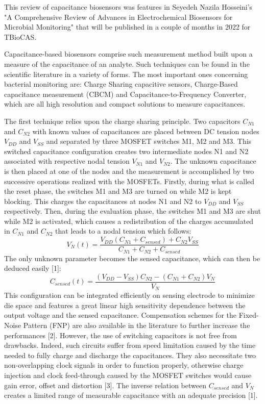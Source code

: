 This review of capacitance biosensors was features in Seyedeh Nazila Hosseini's "A Comprehensive Review of Advances in Electrochemical Biosensors for Microbial Monitoring" that will be published in a couple of months in 2022 for TBioCAS. \par

Capacitance-based biosensors comprise such measurement method built upon a measure of the capacitance of an analyte. Such techniques can be found in the scientific literature in a variety of forms. The most important ones concerning bacterial monitoring are: Charge Sharing capacitive sensors, Charge-Based capacitance measurement (CBCM) and Capacitance-to-Frequency Converter, which are all high resolution and compact solutions to measure capacitances. \par

The first technique relies upon the charge sharing principle. Two capacitors $C_{N1}$ and $C_{N2}$ with known values of capacitances are placed between DC tension nodes $V_{DD}$ and $V_{SS}$ and separated by three MOSFET switches M1, M2 and M3. This switched capacitance configuration creates two intermediate nodes N1 and N2 associated with respective nodal tension $V_{N1}$ and $V_{N2}$. The unknown capacitance is then placed at one of the nodes and the measurement is accomplished by two successive operations realized with the MOSFETs. Firstly, during what is called the reset phase, the switches M1 and M3 are turned on while M2 is kept blocking. This charges the capacitances at nodes N1 and N2 to $V_{DD}$ and $V_{SS}$ respectively. Then, during the evaluation phase, the switches M1 and M3 are shut while M2 is activated, which causes a redistribution of the charges accumulated in $C_{N1}$ and $C_{N2}$ that leads to a nodal tension which follows:
\begin{equation}
   V_{N}(t) = \frac{V_{DD} (C_{N1}+C_{sensed}) + C_{N2} V_{SS}}{C_{N1}+C_{N2}+C_{sensed}}
\end{equation}
The only unknown parameter becomes the sensed capacitance, which can then be deduced easily [1]:
\begin{equation}
   C_{sensed}(t) = \frac{(V_{DD}-V_{SS}) C_{N2} - (C_{N1}+C_{N2}) V_N}{V_N}
\end{equation}
This configuration can be integrated efficiently on sensing electrode to minimize die space and features a great linear high sensitivity dependence between the output voltage and the sensed capacitance. Compensation schemes for the Fixed-Noise Pattern (FNP) are also available in the literature to further increase the performances [2]. However, the use of switching capacitors is not free from drawbacks. Indeed, such circuits suffer from speed limitation caused by the time needed to fully charge and discharge the capacitances. They also necessitate two non-overlapping clock signals in order to function properly, otherwise charge injection and clock feed-through caused by the MOSFET switches would cause gain error, offset and distortion \cite{horowitz1989art}[3]. The inverse relation between $C_{sensed}$ and $V_N$ creates a limited range of measurable capacitance with an adequate precision [1]. \par

